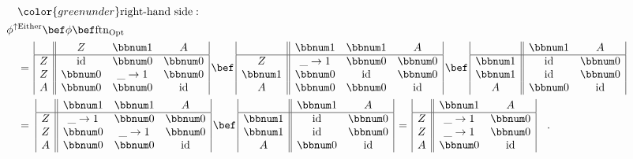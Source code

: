 \begin{align*}
 & \quad{\color{greenunder}\text{right-hand side}:}\quad\\
 & \phi^{\uparrow\text{Either}}\bef\phi\bef\text{ftn}_{\text{Opt}}\\
 & \quad=\,\begin{array}{|c||ccc|}
 & Z & \bbnum 1 & A\\
\hline Z & \text{id} & \bbnum 0 & \bbnum 0\\
Z & \bbnum 0 & \_\rightarrow1 & \bbnum 0\\
A & \bbnum 0 & \bbnum 0 & \text{id}
\end{array}\,\bef\,\begin{array}{|c||ccc|}
 & \bbnum 1 & \bbnum 1 & A\\
\hline Z & \_\rightarrow1 & \bbnum 0 & \bbnum 0\\
\bbnum 1 & \bbnum 0 & \text{id} & \bbnum 0\\
A & \bbnum 0 & \bbnum 0 & \text{id}
\end{array}\,\bef\,\begin{array}{|c||cc|}
 & \bbnum 1 & A\\
\hline \bbnum 1 & \text{id} & \bbnum 0\\
\bbnum 1 & \text{id} & \bbnum 0\\
A & \bbnum 0 & \text{id}
\end{array}\\
 & \quad=\,\,\begin{array}{|c||ccc|}
 & \bbnum 1 & \bbnum 1 & A\\
\hline Z & \_\rightarrow1 & \bbnum 0 & \bbnum 0\\
Z & \bbnum 0 & \_\rightarrow1 & \bbnum 0\\
A & \bbnum 0 & \bbnum 0 & \text{id}
\end{array}\,\bef\,\begin{array}{|c||cc|}
 & \bbnum 1 & A\\
\hline \bbnum 1 & \text{id} & \bbnum 0\\
\bbnum 1 & \text{id} & \bbnum 0\\
A & \bbnum 0 & \text{id}
\end{array}\,=\,\begin{array}{|c||cc|}
 & \bbnum 1 & A\\
\hline Z & \_\rightarrow1 & \bbnum 0\\
Z & \_\rightarrow1 & \bbnum 0\\
A & \bbnum 0 & \text{id}
\end{array}\quad.
\end{align*}


